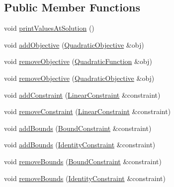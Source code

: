 \subsection*{Public Member Functions}
\begin{DoxyCompactItemize}
\item 
void \hyperlink{classocra_1_1QuadraticSolver_a848c996e3a918c6cb0db3edf66c04cc1}{print\+Values\+At\+Solution} ()
\end{DoxyCompactItemize}
{\bf }\par
\begin{DoxyCompactItemize}
\item 
void \hyperlink{classocra_1_1QuadraticSolver_af8e4dba5faceb48ae3c355bd7fcf7073}{add\+Objective} (\hyperlink{namespaceocra_a0b50673710f087c0f1733aefd1a8e0f7}{Quadratic\+Objective} \&obj)
\item 
void \hyperlink{classocra_1_1QuadraticSolver_aefd3a7556918d2073ab9ae8119f9f60c}{remove\+Objective} (\hyperlink{classocra_1_1QuadraticFunction}{Quadratic\+Function} \&obj)
\item 
void \hyperlink{classocra_1_1QuadraticSolver_a9b1f718481a8200d2135983fc247f146}{remove\+Objective} (\hyperlink{namespaceocra_a0b50673710f087c0f1733aefd1a8e0f7}{Quadratic\+Objective} \&obj)
\end{DoxyCompactItemize}

{\bf }\par
\begin{DoxyCompactItemize}
\item 
void \hyperlink{classocra_1_1QuadraticSolver_a0cf6c866db56031b48a447aa310bad94}{add\+Constraint} (\hyperlink{namespaceocra_ae8b87cf4099be3efc3b410019ad2046e}{Linear\+Constraint} \&constraint)
\item 
void \hyperlink{classocra_1_1QuadraticSolver_ab09f78e724adfb76c6b009c946404113}{remove\+Constraint} (\hyperlink{namespaceocra_ae8b87cf4099be3efc3b410019ad2046e}{Linear\+Constraint} \&constraint)
\end{DoxyCompactItemize}

{\bf }\par
\begin{DoxyCompactItemize}
\item 
void \hyperlink{classocra_1_1QuadraticSolver_ade074ba982ae752d2ee9f12329f89787}{add\+Bounds} (\hyperlink{namespaceocra_a6e55fff77635080219964abc301abf18}{Bound\+Constraint} \&constraint)
\item 
void \hyperlink{classocra_1_1QuadraticSolver_a4f58274f5f1d0eb6645b3e20bc09f090}{add\+Bounds} (\hyperlink{namespaceocra_a5fc023ff4ef8f4b0cdf410e088090731}{Identity\+Constraint} \&constraint)
\item 
void \hyperlink{classocra_1_1QuadraticSolver_aaa23af59a18bd6b2883199fd45a750c0}{remove\+Bounds} (\hyperlink{namespaceocra_a6e55fff77635080219964abc301abf18}{Bound\+Constraint} \&constraint)
\item 
void \hyperlink{classocra_1_1QuadraticSolver_ad3a761be1b05c23ab807effcdc710017}{remove\+Bounds} (\hyperlink{namespaceocra_a5fc023ff4ef8f4b0cdf410e088090731}{Identity\+Constraint} \&constraint)
\end{DoxyCompactItemize}

